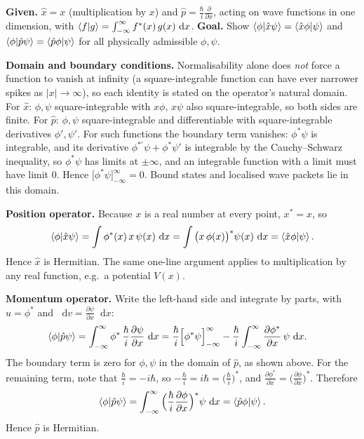 \documentclass[12pt]{article}
\newif\ifsolutions
\renewcommand{\d}{\mathop{}\!\mathrm{d}}
\begin{document}
\ifsolutions
\begin{solutionbox}
\textbf{Given.} $\hat x=x$ (multiplication by $x$) and $\hat p=\frac{\hbar}{i}\frac{\partial}{\partial x}$, acting on wave functions in one dimension, with $\braket{f|g}=\int_{-\infty}^{\infty}f^*(x)\,g(x)\,\d x$. \textbf{Goal.} Show $\braket{\phi|\hat x\psi}=\braket{\hat x\phi|\psi}$ and $\braket{\phi|\hat p\psi}=\braket{\hat p\phi|\psi}$ for all physically admissible $\phi,\psi$.

\textbf{Domain and boundary conditions.} Normalisability alone does \emph{not} force a function to vanish at infinity (a square-integrable function can have ever narrower spikes as $|x|\to\infty$), so each identity is stated on the operator's natural domain. For $\hat x$: $\phi,\psi$ square-integrable with $x\phi,\,x\psi$ also square-integrable, so both sides are finite. For $\hat p$: $\phi,\psi$ square-integrable and differentiable with square-integrable derivatives $\phi',\psi'$. For such functions the boundary term vanishes: $\phi^*\psi$ is integrable, and its derivative $\phi^{*\prime}\psi+\phi^*\psi'$ is integrable by the Cauchy--Schwarz inequality, so $\phi^*\psi$ has limits at $\pm\infty$, and an integrable function with a limit must have limit $0$. Hence $\big[\phi^*\psi\big]_{-\infty}^{\infty}=0$. Bound states and localised wave packets lie in this domain.

\textbf{Position operator.} Because $x$ is a real number at every point, $x^*=x$, so
\[
\braket{\phi|\hat x\psi}=\int\phi^*(x)\,x\,\psi(x)\,\d x=\int\big(x\,\phi(x)\big)^*\psi(x)\,\d x=\braket{\hat x\phi|\psi}.
\]
Hence $\hat x$ is Hermitian. The same one-line argument applies to multiplication by any real function, e.g.\ a potential $V(x)$.

\textbf{Momentum operator.} Write the left-hand side and integrate by parts, with $u=\phi^*$ and $\d v=\frac{\partial\psi}{\partial x}\d x$:
\begin{align*}
\braket{\phi|\hat p\psi}
&=\int_{-\infty}^{\infty}\phi^*\,\frac{\hbar}{i}\frac{\partial\psi}{\partial x}\,\d x
=\frac{\hbar}{i}\Big[\phi^*\psi\Big]_{-\infty}^{\infty}-\frac{\hbar}{i}\int_{-\infty}^{\infty}\frac{\partial\phi^*}{\partial x}\,\psi\,\d x .
\end{align*}
The boundary term is zero for $\phi,\psi$ in the domain of $\hat p$, as shown above. For the remaining term, note that $\frac{\hbar}{i}=-i\hbar$, so $-\frac{\hbar}{i}=i\hbar=\big(\frac{\hbar}{i}\big)^*$, and $\frac{\partial\phi^*}{\partial x}=\big(\frac{\partial\phi}{\partial x}\big)^*$. Therefore
\[
\braket{\phi|\hat p\psi}=\int_{-\infty}^{\infty}\Big(\frac{\hbar}{i}\frac{\partial\phi}{\partial x}\Big)^*\psi\,\d x=\braket{\hat p\phi|\psi}.
\]
Hence $\hat p$ is Hermitian.


\end{solutionbox}
\end{document}
